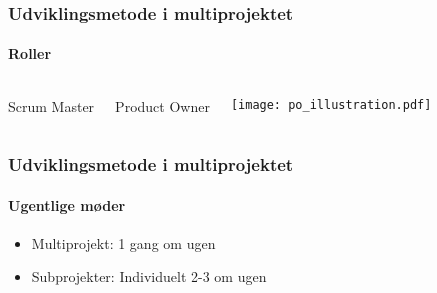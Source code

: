 \begin{frame}
    \frametitle{Udviklingsmetode i multiprojektet}
    \framesubtitle{Roller}
    \begin{columns}[t]
      \begin{mdframed}[align=center, backgroundcolor=color3!10, linecolor=color3!50, linewidth=1pt]
        Scrum Master
      \end{mdframed}
      \begin{mdframed}[align=center, backgroundcolor=color3!10, linecolor=color3!50, linewidth=1pt]
        Product Owner
      \end{mdframed}
      \vspace{.6cm}
      \centering
      \pause\texttt{[image: po\_illustration.pdf]}
    \end{columns}
    
    
\end{frame}

\begin{frame}
    \frametitle{Udviklingsmetode i multiprojektet}
    \framesubtitle{Ugentlige møder}
    
    \begin{itemize}
      \item Multiprojekt: 1 gang om ugen
      \item Subprojekter: Individuelt 2-3 om ugen
    \end{itemize}
\end{frame}


